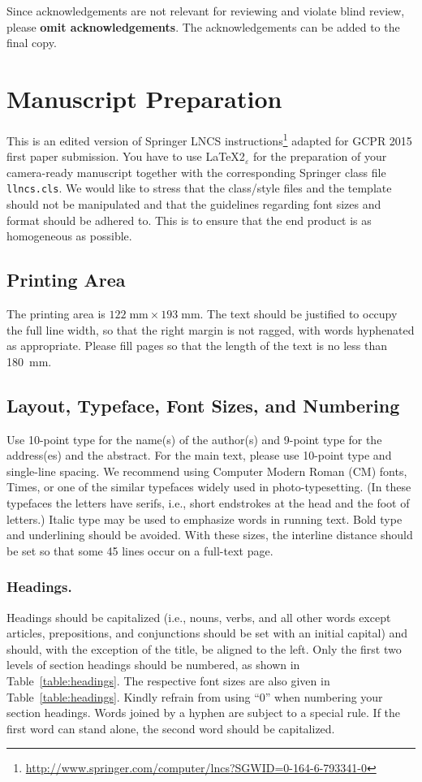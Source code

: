 \documentclass[runningheads]{llncs}
\begin{document}
	Since acknowledgements are not relevant for reviewing and violate blind review, please {\bf omit acknowledgements}.
	The acknowledgements can be added to the final copy.

	\section{Manuscript Preparation}
	This is an edited version of Springer LNCS instructions\footnote{\url{http://www.springer.com/computer/lncs?SGWID=0-164-6-793341-0}} adapted for GCPR 2015 first paper submission.
	You have to use \LaTeX2$_\varepsilon$ for the preparation of your camera-ready manuscript together with the corresponding Springer class file \verb+llncs.cls+.
	We would like to stress that the class/style files and the template should not be manipulated and that the guidelines regarding font sizes and format should be adhered to.
	This is to ensure that the end product is as homogeneous as possible.

	\subsection{Printing Area}
	The printing area is $122  \; \mbox{mm} \times 193 \;\mbox{mm}$.
	The text should be justified to occupy the full line width, so that the right margin is not ragged, with words hyphenated as appropriate.
	Please fill pages so that the length of the text is no less than 180~mm.

	\subsection{Layout, Typeface, Font Sizes, and Numbering}
	Use 10-point type for the name(s) of the author(s) and 9-point type for the address(es) and the abstract.
	For the main text, please use 10-point type and single-line spacing.
	We recommend using Computer Modern Roman (CM) fonts, Times, or one of the similar typefaces widely used in photo-typesetting.
	(In these typefaces the letters have serifs, i.e., short endstrokes at the head and the foot of letters.)
	Italic type may be used to emphasize words in running text.
	Bold type and underlining should be avoided.
	With these sizes, the interline distance should be set so that some 45 lines occur on a full-text page.

	\subsubsection{Headings.}
	Headings should be capitalized (i.e., nouns, verbs, and all other words except articles, prepositions, and conjunctions should be set with an initial capital) and should, with the exception of the title, be aligned to the left.
	Only the first two levels of section headings should be numbered, as shown in Table~\ref{table:headings}.
	The respective font sizes are also given in Table~\ref{table:headings}.
	Kindly refrain from using ``0'' when numbering your section headings.
	Words joined by a hyphen are subject to a special rule.
	If the first word can stand alone, the second word should be capitalized.
\end{document}
